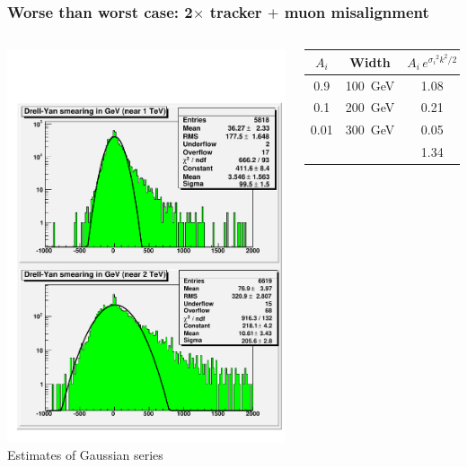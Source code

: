\documentclass[compress]{beamer}
\begin{document}
\begin{frame}
\frametitle{Worse than worst case: 2$\times$ tracker $+$ muon misalignment}
\begin{columns}
\includegraphics[width=\linewidth]{dy_smearing_inGeV_tracker2.pdf}
Estimates of Gaussian series

\vspace{0.1 cm}
\begin{tabular}{c c c}
$A_i$ & Width & $A_i \, e^{{\sigma_i}^2 k^2 / 2}$ \\\hline
0.9 & 100~GeV & 1.08 \\
0.1 & 200~GeV & 0.21 \\
0.01 & 300~GeV & 0.05 \\\hline
& & 1.34 \\
\end{tabular}


\end{columns}
\end{frame}
\end{document}
